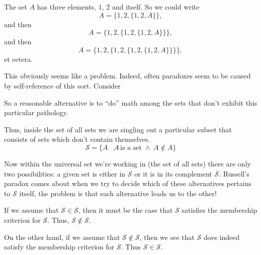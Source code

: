 \documentclass[10pt,]{book}
\theoremstyle{plain}
\theoremstyle{definition}
\theoremstyle{definition}
\numberwithin{equation}{section}
\newcommand{\suchthat}{\;  \;}
\begin{document}
    The set \(A\) has three elements, \(1\), \(2\) and itself. So we
    could write
    \begin{equation*}
      A = \{ 1, 2, \{ 1, 2, A \} \},
    \end{equation*}
    and then
    \begin{equation*}
      A = \{ 1, 2, \{ 1, 2, \{ 1, 2, A \} \} \},
    \end{equation*}
    and then
    \begin{equation*}
      A = \{ 1, 2, \{ 1, 2, \{ 1, 2, \{ 1, 2, A \} \} \} \},
    \end{equation*}
    et cetera.
\par

    This obviously seems like a problem. Indeed, often paradoxes seem to
    be caused by self-reference of this sort. Consider
\par

    So a reasonable alternative
    is to ``do'' math among the sets that don't exhibit this particular
    pathology.
\par

    Thus, inside the set of all sets we are singling out a particular subset
    that consists of sets which don't contain themselves.
    \begin{equation*}
      {\mathcal S} = \{ A \suchthat \; A \,\mbox{is a set}  \; \land \; A \notin A \}
    \end{equation*}
\par

    Now within the universal set we're working in (the set of all sets) there
    are only two possibilities: a given set is either in \({\mathcal S}\) or
    it is in its complement \(\overline{\mathcal S}\). Russell's paradox
    comes about when we try to decide which of these alternatives pertains
    to \({\mathcal S}\) itself, the problem is that each alternative leads us
    to the other!
\par

    If we assume that \({\mathcal S} \in {\mathcal S}\), then it must be the
    case that \({\mathcal S}\) satisfies the membership criterion for \({\mathcal S}\).
    Thus, \({\mathcal S} \notin {\mathcal S}\).
\par

    On the other hand, if we assume that \({\mathcal S} \notin {\mathcal S}\),
    then we see that \({\mathcal S}\) does indeed satisfy the membership criterion for \({\mathcal S}\). Thus \({\mathcal S} \in {\mathcal S}\).
\par
\end{document}
